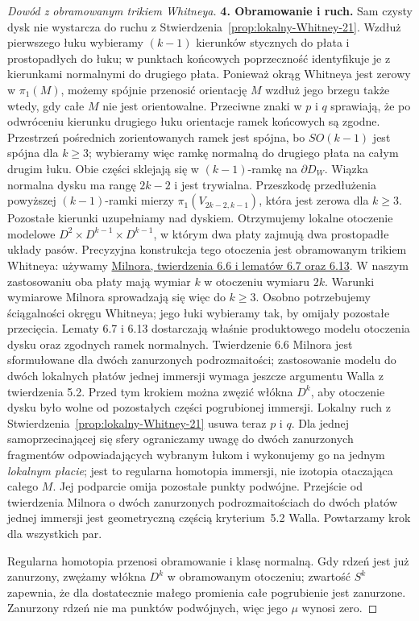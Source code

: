 \begin{proof}[Dowód z obramowanym trikiem Whitneya]
\textbf{4. Obramowanie i ruch.}
Sam czysty dysk nie wystarcza do ruchu z
Stwierdzenia~\ref{prop:lokalny-Whitney-21}.
Wzdłuż pierwszego łuku wybieramy $(k-1)$ kierunków
stycznych do płata i prostopadłych do łuku;
w punktach końcowych poprzeczność identyfikuje
je z kierunkami normalnymi do drugiego płata.
Ponieważ okrąg Whitneya jest zerowy w $\pi_1(M)$,
możemy spójnie przenosić orientację $M$ wzdłuż
jego brzegu także wtedy, gdy całe $M$ nie jest
orientowalne. Przeciwne znaki w $p$ i $q$ sprawiają,
że po odwróceniu kierunku drugiego łuku orientacje
ramek końcowych są zgodne. Przestrzeń pośrednich
zorientowanych ramek jest spójna, bo $SO(k-1)$
jest spójna dla $k\geq3$; wybieramy więc ramkę
normalną do drugiego płata na całym drugim łuku.
Obie części sklejają się w $(k-1)$-ramkę na
$\partial D_W$. Wiązka normalna
dysku ma rangę $2k-2$ i jest trywialna. Przeszkodę
przedłużenia powyższej $(k-1)$-ramki mierzy
$\pi_1(V_{2k-2,k-1})$, która jest zerowa dla
$k\geq3$. Pozostałe kierunki uzupełniamy nad
dyskiem. Otrzymujemy lokalne otoczenie modelowe
$D^2\times D^{k-1}\times D^{k-1}$, w którym
dwa płaty zajmują dwa prostopadłe układy pasów.
Precyzyjna konstrukcja tego otoczenia jest
obramowanym trikiem Whitneya: używamy
\href{https://webhomes.maths.ed.ac.uk/~v1ranick/surgery/hcobord.pdf}
{Milnora, twierdzenia 6.6 i lematów 6.7 oraz 6.13}.
W naszym zastosowaniu oba płaty mają wymiar $k$
w otoczeniu wymiaru $2k$. Warunki wymiarowe
Milnora sprowadzają się więc do $k\geq3$.
Osobno potrzebujemy ściągalności okręgu Whitneya;
jego łuki wybieramy tak, by omijały pozostałe
przecięcia. Lematy 6.7
i 6.13 dostarczają właśnie produktowego modelu
otoczenia dysku oraz zgodnych ramek normalnych.
Twierdzenie 6.6 Milnora jest sformułowane dla
dwóch zanurzonych podrozmaitości; zastosowanie
modelu do dwóch lokalnych płatów jednej immersji
wymaga jeszcze argumentu Walla z twierdzenia 5.2.
Przed tym krokiem można zwęzić włókna $D^k$,
aby otoczenie dysku było wolne od pozostałych
części pogrubionej immersji.
Lokalny ruch z
Stwierdzenia~\ref{prop:lokalny-Whitney-21}
usuwa teraz $p$ i $q$. Dla jednej samoprzecinającej
się sfery ograniczamy uwagę do dwóch zanurzonych
fragmentów odpowiadających wybranym łukom
i wykonujemy go na jednym \emph{lokalnym płacie};
jest to regularna homotopia
immersji, nie izotopia otaczająca całego $M$.
Jej podparcie omija pozostałe punkty podwójne.
Przejście od twierdzenia Milnora o dwóch zanurzonych
podrozmaitościach do dwóch płatów jednej immersji
jest geometryczną częścią kryterium~5.2 Walla.
Powtarzamy krok dla wszystkich par.

Regularna homotopia przenosi obramowanie i klasę
normalną. Gdy rdzeń jest już zanurzony, zwężamy
włókna $D^k$ w obramowanym otoczeniu; zwartość
$S^k$ zapewnia, że dla dostatecznie małego promienia
całe pogrubienie jest zanurzone. Zanurzony rdzeń
nie ma punktów podwójnych, więc jego $\mu$ wynosi
zero.
\end{proof}

